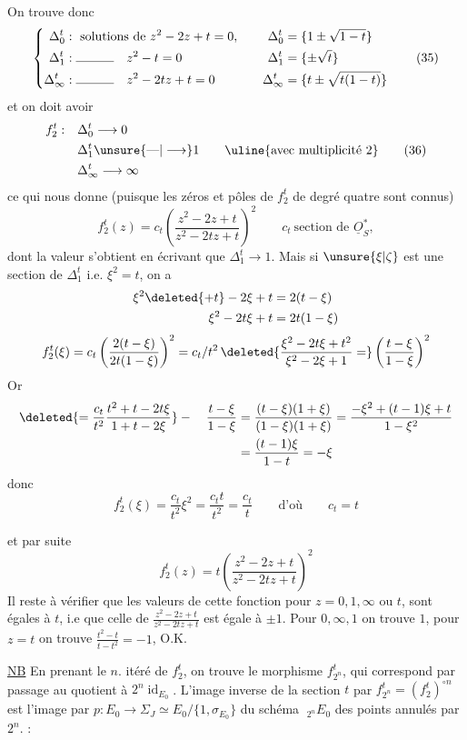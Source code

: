 On trouve donc
\[
\left\{\begin{aligned}
\Delta_0^t &: \text{ solutions de }z^2-2z+t=0,\quad &\Delta_0^t&=\{1\pm\sqrt{1-t}\}\\
\Delta_1^t &: \rule{3em}{.35pt}\quad z^2-t=0 &\Delta_1^t&=\{\pm\sqrt t\}\\
\Delta_\infty^t &: \rule{3em}{.35pt}\quad z^2-2tz+t=0 &\Delta_\infty^t&=\{t\pm\sqrt{t(1-t)}\}
\end{aligned}\right.
\tag*{(35)}
\]
et on doit avoir
\[
\begin{aligned}
f_2^t:\quad &\Delta_0^t\longrightarrow 0\\
&\Delta_1^t\unsure{\text{---}|\longrightarrow}1\\
&\Delta_\infty^t\longrightarrow\infty
\end{aligned}
\qquad\text{\uline{avec multiplicité 2}}
\tag*{(36)}
\]
ce qui nous donne (puisque les zéros et pôles de $f_2^t$ de degré quatre sont connus)
\[
f_2^t(z)=c_t\left(\frac{z^2-2z+t}{z^2-2tz+t}\right)^2
\qquad c_t\ \text{section de }\underline O_S^*,
\]
dont la valeur s'obtient en écrivant que $\Delta_1^t\longrightarrow1$. Mais si $\unsure{\xi|\zeta}$ est une section de $\Delta_1^t$ i.e. $\xi^2=t$, on a
\[
\begin{aligned}
\xi^2\deleted{+t}-2\xi+t&=2(t-\xi)\\
\xi^2-2t\xi+t&=2t(1-\xi)
\end{aligned}
\]
\[
f_2^t(\xi)=c_t\left(\frac{2(t-\xi)}{2t(1-\xi)}\right)^2
=c_t/t^2\,\deleted{\frac{\xi^2-2t\xi+t^2}{\xi^2-2\xi+1}=}\left(\frac{t-\xi}{1-\xi}\right)^2
\]
Or
\[
\begin{aligned}
\deleted{=\frac{c_t}{t^2}\frac{t^2+t-2t\xi}{1+t-2\xi}}-\quad
\frac{t-\xi}{1-\xi}&=\frac{(t-\xi)(1+\xi)}{(1-\xi)(1+\xi)}
=\frac{-\xi^2+(t-1)\xi+t}{1-\xi^2}\\
&=\frac{(t-1)\xi}{1-t}=-\xi
\end{aligned}
\]
donc
\[
 f_2^t(\xi)=\frac{c_t}{t^2}\xi^2=\frac{c_t t}{t^2}=\frac{c_t}{t}
 \qquad\text{d'où}\qquad c_t=t
\]

et par suite
\[
 f_2^t(z)=t\left(\frac{z^2-2z+t}{z^2-2tz+t}\right)^2
 \tag*{(37)}
\]
Il reste à vérifier que les valeurs de cette fonction pour $z=0,1,\infty$ ou $t$, sont égales à $t$, i.e que celle de $\frac{z^2-2z+t}{z^2-2tz+t}$ est égale à $\pm1$. Pour $0,\infty,1$ on trouve $1$, pour $z=t$ on trouve $\frac{t^2-t}{t-t^2}=-1$, O.K.

\uline{NB} En prenant le $n$. itéré de $f_2^t$, on trouve le morphisme $f_{2^n}^t$, qui correspond par passage au quotient à $2^n\operatorname{id}_{E_0}$. L'image inverse de la section $t$ par $f_{2^n}^t=(f_2^t)^{\circ n}$ est l'image par $p:E_0\longrightarrow\Sigma_J\simeq E_0/\{1,\sigma_{E_0}\}$ du  schéma  $\;{}_{2^n}E_0$ des points annulés par $2^n$.
:
